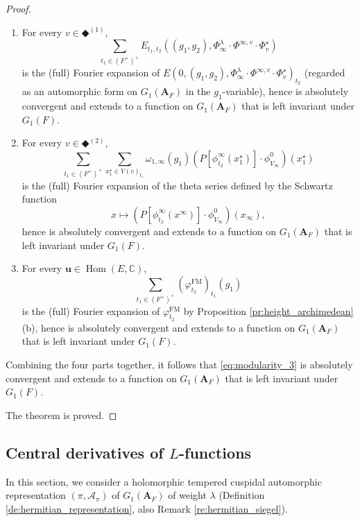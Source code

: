 \documentclass[12pt]{amsart}
\numberwithin{equation}{section}
\theoremstyle{plain}
\theoremstyle{definition}
\theoremstyle{remark}
\renewcommand{\b}[1]{\mathbf{#1}}
\renewcommand{\c}[1]{\mathcal{#1}}
\renewcommand{\d}[1]{\mathbb{#1}}
\renewcommand{\r}[1]{\mathrm{#1}}
\renewcommand{\(}{\left(}
\renewcommand{\)}{\right)}
\newcommand{\bA}{\b A}
\newcommand{\cA}{\c A}
\newcommand{\dC}{\d C}
\newcommand{\bbu}{\boldsymbol{u}}
\newcommand{\KM}{\r{FM}}
\DeclareMathOperator{\Hom}{Hom}
\begin{document}
\begin{proof}
\begin{enumerate}
  \item For every $v\in\Diamondblack^{(1)}$,
      \[
      \sum_{t_1\in(F^\times)^+}E_{t_1,t_2}((g_1,g_2),\Phi^\lambda_\infty\cdot\Phi^{\infty,v}\cdot\Phi^\star_v)
      \]
      is the (full) Fourier expansion of $E(0,(g_1,g_2),\Phi^\lambda_\infty\cdot\Phi^{\infty,v}\cdot\Phi^\star_v)_{t_2}$ (regarded as an automorphic form on $G_1(\bA_F)$ in the $g_1$-variable), hence is absolutely convergent and extends to a function on $G_1(\bA_F)$ that is left invariant under $G_1(F)$.

  \item For every $v\in\Diamondblack^{(2)}$,
      \[
      \sum_{t_1\in(F^\times)^+}\sum_{x^\star_1\in V(v)_{t_1}}\omega_{1,\infty}(g_1)\(P[\phi^\infty_{t_2}(x^\star_1)]\cdot\phi^0_{V_\infty}\)(x^\star_1)
      \]
      is the (full) Fourier expansion of the theta series defined by the Schwartz function 
      \[
      x\mapsto \(P[\phi^\infty_{t_2}(x^\infty)]\cdot\phi^0_{V_\infty}\)(x_\infty),
      \]
      hence is absolutely convergent and extends to a function on $G_1(\bA_F)$ that is left invariant under $G_1(F)$.

  \item For every $\bbu\in\Hom(E,\dC)$,
      \[
      \sum_{t_1\in(F^\times)^+}(\varphi^\KM_{t_2})_{t_1}(g_1)
      \]
      is the (full) Fourier expansion of $\varphi^\KM_{t_2}$ by Proposition \ref{pr:height_archimedean}(b), hence is absolutely convergent and extends to a function on $G_1(\bA_F)$ that is left invariant under $G_1(F)$.
\end{enumerate}
Combining the four parts together, it follows that \eqref{eq:modularity_3} is absolutely convergent and extends to a function on $G_1(\bA_F)$ that is left invariant under $G_1(F)$.

The theorem is proved.
\end{proof}





\subsection{Central derivatives of $L$-functions}
\label{ss:derivative}

In this section, we consider a holomorphic tempered cuspidal automorphic representation $(\pi,\cA_\pi)$ of $G_1(\bA_F)$ of weight $\lambda$ (Definition \ref{de:hermitian_representation}, also Remark \ref{re:hermitian_siegel}).
\end{document}
